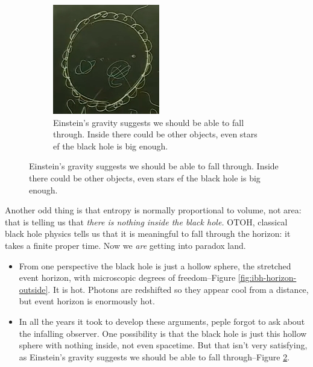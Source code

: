 \documentclass[]{article}
\begin{document}
\begin{figure}[H]
\begin{center}
\begin{subfigure}[t]{0.45\textwidth}
		\end{subfigure}
		\;
		\begin{subfigure}[t]{0.45\textwidth}
			\caption{Einstein's gravity suggests we should be able to fall through. Inside there could be other objects, even stars ef the black hole is big enough.}\label{fig:ibh-horizon-inside}
			\includegraphics[width=\textwidth]{ibh-horizon-inside}
		\end{subfigure}
	\end{center}
\end{figure}
Another odd thing is that entropy is normally proportional to volume, not area: that is telling us that \emph{there is nothing inside the black hole.}
OTOH, classical black hole physics tells us that it is meaningful to fall through the horizon: it takes a finite proper time. Now we \emph{are} getting into paradox land.
\begin{itemize}
	\item From one perspective the black hole is just a hollow sphere, the stretched event horizon, with microscopic degrees of freedom--Figure \ref{fig:ibh-horizon-outside}. It is hot. Photons are redshifted so they appear cool from a distance, but event horizon is enormously hot.
	\item In all the years it took to develop these arguments, peple forgot to ask about the infalling observer. One possibility is that the black hole is just this hollow sphere with nothing inside, not even spacetime. But that isn't very satisfying, as Einstein's gravity suggests we should be able to fall through--Figure \ref{fig:ibh-horizon-inside}.
\end{itemize}
\end{document}
